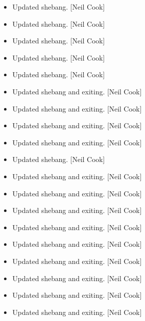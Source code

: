 \documentclass[a4paper,10pt,english]{report}
\begin{document}
\begin{itemize}
\item {} 
Updated shebang. {[}Neil Cook{]}

\item {} 
Updated shebang. {[}Neil Cook{]}

\item {} 
Updated shebang. {[}Neil Cook{]}

\item {} 
Updated shebang. {[}Neil Cook{]}

\item {} 
Updated shebang. {[}Neil Cook{]}

\item {} 
Updated shebang and  exiting. {[}Neil Cook{]}

\item {} 
Updated shebang and  exiting. {[}Neil Cook{]}

\item {} 
Updated shebang and  exiting. {[}Neil Cook{]}

\item {} 
Updated shebang and  exiting. {[}Neil Cook{]}

\item {} 
Updated shebang. {[}Neil Cook{]}

\item {} 
Updated shebang and  exiting. {[}Neil Cook{]}

\item {} 
Updated shebang and  exiting. {[}Neil Cook{]}

\item {} 
Updated shebang and  exiting. {[}Neil Cook{]}

\item {} 
Updated shebang and  exiting. {[}Neil Cook{]}

\item {} 
Updated shebang and  exiting. {[}Neil Cook{]}

\item {} 
Updated shebang and  exiting. {[}Neil Cook{]}

\item {} 
Updated shebang and  exiting. {[}Neil Cook{]}

\item {} 
Updated shebang and  exiting. {[}Neil Cook{]}

\item {} 
Updated shebang and  exiting. {[}Neil Cook{]}

\end{itemize}
\end{document}
